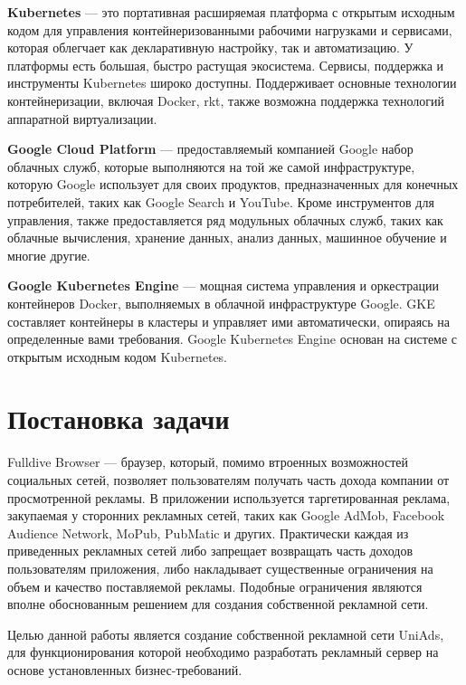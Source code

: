 \documentclass[specification,annotation,times]{itmo-student-thesis}
\begin{document}
\textbf{Kubernetes}\label{kubernetes} — это портативная расширяемая платформа с открытым исходным кодом для управления контейнеризованными рабочими нагрузками и сервисами, которая облегчает как декларативную настройку, так и автоматизацию. У платформы есть большая, быстро растущая экосистема. Сервисы, поддержка и инструменты Kubernetes широко доступны. Поддерживает основные технологии контейнеризации, включая Docker, rkt, также возможна поддержка технологий аппаратной виртуализации.

\textbf{Google Cloud Platform} \label{GCP} — предоставляемый компанией Google набор облачных служб, которые выполняются на той же самой инфраструктуре, которую Google использует для своих продуктов, предназначенных для конечных потребителей, таких как Google Search и YouTube. Кроме инструментов для управления, также предоставляется ряд модульных облачных служб, таких как облачные вычисления, хранение данных, анализ данных, машинное обучение и многие другие.

\textbf{Google Kubernetes Engine} \label{GKE} — мощная система управления и оркестрации контейнеров Docker, выполняемых в облачной инфраструктуре Google. GKE составляет контейнеры в кластеры и управляет ими автоматически, опираясь на определенные вами требования. Google Kubernetes Engine основан на системе с открытым исходным кодом Kubernetes.




\section{Постановка задачи\label{sec:problem}}

Fulldive Browser — браузер, который, помимо втроенных возможностей социальных сетей, позволяет пользователям получать часть дохода компании от просмотренной рекламы. В приложении используется таргетированная реклама, закупаемая у сторонних рекламных сетей, таких как Google AdMob, Facebook Audience Network, MoPub, PubMatic и других. Практически каждая из приведенных рекламных сетей либо запрещает возвращать часть доходов пользователям приложения, либо накладывает существенные ограничения на объем и качество поставляемой рекламы. Подобные ограничения являются вполне обоснованным решением для создания собственной рекламной сети.

Целью данной работы является создание собственной рекламной сети UniAds, для функционирования которой необходимо разработать рекламный сервер на основе установленных бизнес-требований.
\end{document}
